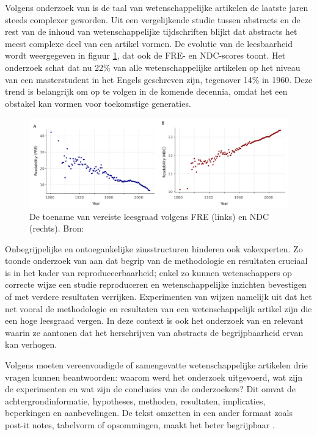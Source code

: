 Volgens onderzoek van \textcite{PlavenSigray2017} is de taal van wetenschappelijke artikelen de laatste jaren steeds complexer geworden. Uit een vergelijkende studie tussen abstracts en de rest van de inhoud van wetenschappelijke tijdschriften blijkt dat abstracts het meest complexe deel van een artikel vormen. De evolutie van de leesbaarheid wordt weergegeven in figuur \ref{img:fre-ndc}, dat ook de FRE- en NDC-scores toont. Het onderzoek schat dat nu 22\% van alle wetenschappelijke artikelen op het niveau van een masterstudent in het Engels geschreven zijn, tegenover 14\% in 1960. Deze trend is belangrijk om op te volgen in de komende decennia, omdat het een obstakel kan vormen voor toekomstige generaties.

\begin{figure}[H]
	\includegraphics[width=\linewidth]{img/fre-ndc.png}
	\caption{De toename van vereiste leesgraad volgens FRE (links) en NDC (rechts). Bron: \autocite{PlavenSigray2017}}
	\label{img:fre-ndc}
\end{figure}

Onbegrijpelijke en ontoegankelijke zinsstructuren hinderen ook vakexperten. Zo toonde onderzoek van \textcite{McNutt2014} aan dat begrip van de methodologie en resultaten cruciaal is in het kader van reproduceerbaarheid; enkel zo kunnen wetenschappers op correcte wijze een studie reproduceren en wetenschappelijke inzichten bevestigen of met verdere resultaten verrijken. Experimenten van \textcite{Hubbard2017} wijzen namelijk uit dat het net vooral de methodologie en resultaten van een wetenschappelijk artikel zijn die een hoge leesgraad vergen. In deze context is ook het onderzoek van \textcite{Hartley1999} en \textcite{Snow2010} relevant waarin ze aantonen dat het herschrijven van abstracts de begrijpbaarheid ervan kan verhogen.

\medspace

Volgens \textcite{Hollenkamp2020, McCombes2022} moeten vereenvoudigde of samengevatte wetenschappelijke artikelen drie vragen kunnen beantwoorden: waarom werd het onderzoek uitgevoerd, wat zijn de experimenten en wat zijn de conclusies van de onderzoekers? Dit omvat de achtergrondinformatie, hypotheses, methoden, resultaten, implicaties, beperkingen en aanbevelingen. De tekst omzetten in een ander formaat zoals post-it notes, tabelvorm of opsommingen, maakt het beter begrijpbaar \autocite{Rijkhoff2022}. 

